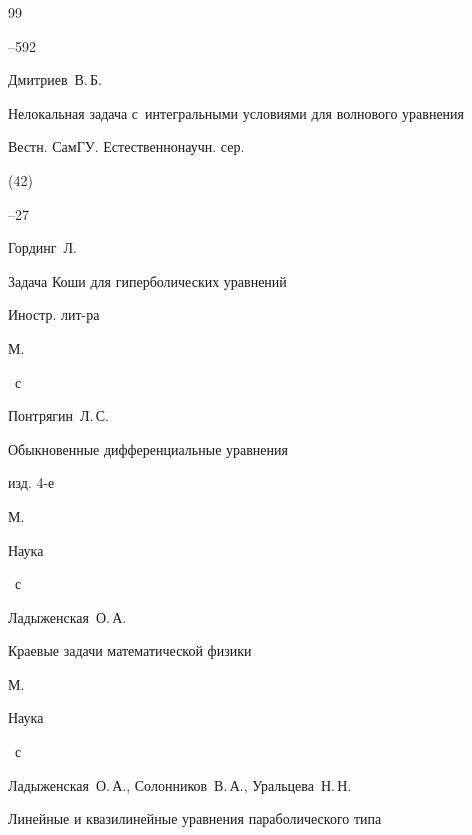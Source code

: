 \begin{thebibliography}{99}


--592







\by Дмитриев~В.\,Б.


\paper Нелокальная задача с~интегральными условиями для волнового уравнения


\jour Вестн. СамГУ. Естественнонаучн. сер.




(42)


--27







\by Гординг~Л.


\book Задача Коши для гиперболических уравнений


\publ Иностр. лит-ра


\publaddr М.




~с










\by Понтрягин~Л.\,С.


\book Обыкновенные дифференциальные уравнения


\bookinfo изд. 4-е


\publaddr  М.


\publ Наука




~с







\by Ладыженская~О.\,А.


\book Краевые задачи математической физики


\publaddr М.


\publ Наука




~с







\by Ладыженская~О.\,А., Солонников~В.\,А., Уральцева~Н.\,Н.


\book Линейные и квазилинейные уравнения параболического типа



\end{thebibliography}
